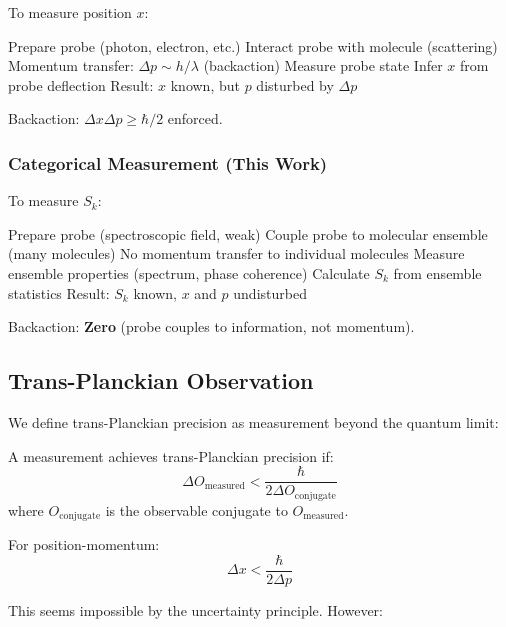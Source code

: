To measure position $x$:
\begin{algorithmic}[1]
\State Prepare probe (photon, electron, etc.)
\State Interact probe with molecule (scattering)
\State Momentum transfer: $\Delta p \sim h/\lambda$ (backaction)
\State Measure probe state
\State Infer $x$ from probe deflection
\State Result: $x$ known, but $p$ disturbed by $\Delta p$
\end{algorithmic}

Backaction: $\Delta x \Delta p \geq \hbar/2$ enforced.

\subsubsection{Categorical Measurement (This Work)}

To measure $S_k$:
\begin{algorithmic}[1]
\State Prepare probe (spectroscopic field, weak)
\State Couple probe to molecular ensemble (many molecules)
\State No momentum transfer to individual molecules
\State Measure ensemble properties (spectrum, phase coherence)
\State Calculate $S_k$ from ensemble statistics
\State Result: $S_k$ known, $x$ and $p$ undisturbed
\end{algorithmic}

Backaction: \textbf{Zero} (probe couples to information, not momentum).

\subsection{Trans-Planckian Observation}

We define trans-Planckian precision as measurement beyond the quantum limit:

\begin{definition}
A measurement achieves trans-Planckian precision if:
\begin{equation}
\Delta O_{\text{measured}} < \frac{\hbar}{2\Delta O_{\text{conjugate}}}
\end{equation}
where $O_{\text{conjugate}}$ is the observable conjugate to $O_{\text{measured}}$.
\end{definition}

For position-momentum:
\begin{equation}
\Delta x < \frac{\hbar}{2\Delta p}
\end{equation}

This seems impossible by the uncertainty principle. However:

